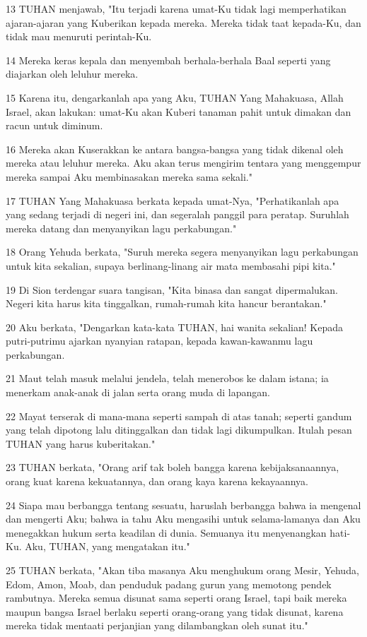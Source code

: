 \par 13 TUHAN menjawab, "Itu terjadi karena umat-Ku tidak lagi memperhatikan ajaran-ajaran yang Kuberikan kepada mereka. Mereka tidak taat kepada-Ku, dan tidak mau menuruti perintah-Ku.
\par 14 Mereka keras kepala dan menyembah berhala-berhala Baal seperti yang diajarkan oleh leluhur mereka.
\par 15 Karena itu, dengarkanlah apa yang Aku, TUHAN Yang Mahakuasa, Allah Israel, akan lakukan: umat-Ku akan Kuberi tanaman pahit untuk dimakan dan racun untuk diminum.
\par 16 Mereka akan Kuserakkan ke antara bangsa-bangsa yang tidak dikenal oleh mereka atau leluhur mereka. Aku akan terus mengirim tentara yang menggempur mereka sampai Aku membinasakan mereka sama sekali."
\par 17 TUHAN Yang Mahakuasa berkata kepada umat-Nya, "Perhatikanlah apa yang sedang terjadi di negeri ini, dan segeralah panggil para peratap. Suruhlah mereka datang dan menyanyikan lagu perkabungan."
\par 18 Orang Yehuda berkata, "Suruh mereka segera menyanyikan lagu perkabungan untuk kita sekalian, supaya berlinang-linang air mata membasahi pipi kita."
\par 19 Di Sion terdengar suara tangisan, "Kita binasa dan sangat dipermalukan. Negeri kita harus kita tinggalkan, rumah-rumah kita hancur berantakan."
\par 20 Aku berkata, "Dengarkan kata-kata TUHAN, hai wanita sekalian! Kepada putri-putrimu ajarkan nyanyian ratapan, kepada kawan-kawanmu lagu perkabungan.
\par 21 Maut telah masuk melalui jendela, telah menerobos ke dalam istana; ia menerkam anak-anak di jalan serta orang muda di lapangan.
\par 22 Mayat terserak di mana-mana seperti sampah di atas tanah; seperti gandum yang telah dipotong lalu ditinggalkan dan tidak lagi dikumpulkan. Itulah pesan TUHAN yang harus kuberitakan."
\par 23 TUHAN berkata, "Orang arif tak boleh bangga karena kebijaksanaannya, orang kuat karena kekuatannya, dan orang kaya karena kekayaannya.
\par 24 Siapa mau berbangga tentang sesuatu, haruslah berbangga bahwa ia mengenal dan mengerti Aku; bahwa ia tahu Aku mengasihi untuk selama-lamanya dan Aku menegakkan hukum serta keadilan di dunia. Semuanya itu menyenangkan hati-Ku. Aku, TUHAN, yang mengatakan itu."
\par 25 TUHAN berkata, "Akan tiba masanya Aku menghukum orang Mesir, Yehuda, Edom, Amon, Moab, dan penduduk padang gurun yang memotong pendek rambutnya. Mereka semua disunat sama seperti orang Israel, tapi baik mereka maupun bangsa Israel berlaku seperti orang-orang yang tidak disunat, karena mereka tidak mentaati perjanjian yang dilambangkan oleh sunat itu."

